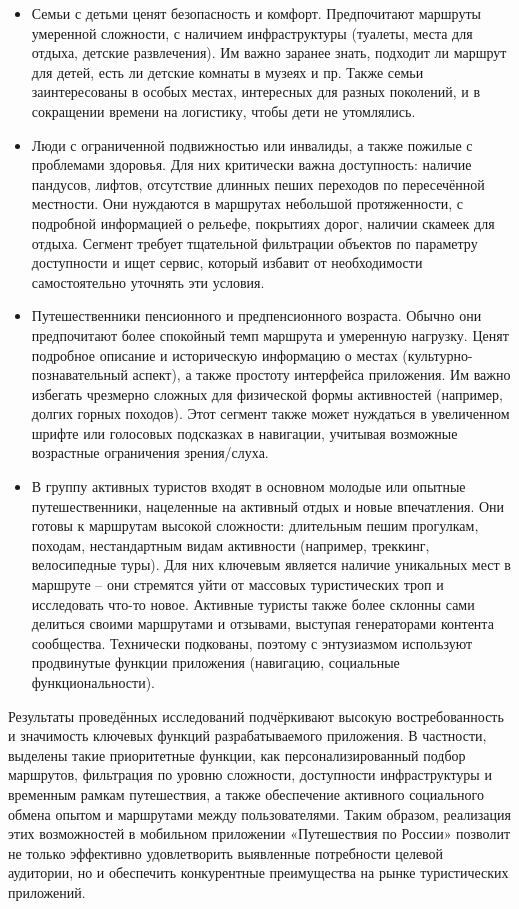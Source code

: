 \begin{itemize}
    \item 	Семьи с детьми ценят безопасность и комфорт. Предпочитают маршруты умеренной сложности, с наличием инфраструктуры (туалеты, места для отдыха, детские развлечения). Им важно заранее знать, подходит ли маршрут для детей, есть ли детские комнаты в музеях и пр. Также семьи заинтересованы в особых местах, интересных для разных поколений, и в сокращении времени на логистику, чтобы дети не утомлялись.
    \item 	Люди с ограниченной подвижностью или инвалиды, а также пожилые с проблемами здоровья. Для них критически важна доступность: наличие пандусов, лифтов, отсутствие длинных пеших переходов по пересечённой местности. Они нуждаются в маршрутах небольшой протяженности, с подробной информацией о рельефе, покрытиях дорог, наличии скамеек для отдыха. Сегмент требует тщательной фильтрации объектов по параметру доступности и ищет сервис, который избавит от необходимости самостоятельно уточнять эти условия.
    \item 	Путешественники пенсионного и предпенсионного возраста. Обычно они предпочитают более спокойный темп маршрута и умеренную нагрузку. Ценят подробное описание и историческую информацию о местах (культурно-познавательный аспект), а также простоту интерфейса приложения. Им важно избегать чрезмерно сложных для физической формы активностей (например, долгих горных походов). Этот сегмент также может нуждаться в увеличенном шрифте или голосовых подсказках в навигации, учитывая возможные возрастные ограничения зрения/слуха.
    \item 	В группу активных туристов входят в основном молодые или опытные путешественники, нацеленные на активный отдых и новые впечатления. Они готовы к маршрутам высокой сложности: длительным пешим прогулкам, походам, нестандартным видам активности (например, треккинг, велосипедные туры). Для них ключевым является наличие уникальных мест в маршруте – они стремятся уйти от массовых туристических троп и исследовать что-то новое. Активные туристы также более склонны сами делиться своими маршрутами и отзывами, выступая генераторами контента сообщества. Технически подкованы, поэтому с энтузиазмом используют продвинутые функции приложения (навигацию, социальные функциональности).
\end{itemize}

Результаты проведённых исследований подчёркивают высокую востребованность и значимость ключевых функций разрабатываемого приложения. В частности, выделены такие приоритетные функции, как персонализированный подбор маршрутов, фильтрация по уровню сложности, доступности инфраструктуры и временным рамкам путешествия, а также обеспечение активного социального обмена опытом и маршрутами между пользователями. Таким образом, реализация этих возможностей в мобильном приложении «Путешествия по России» позволит не только эффективно удовлетворить выявленные потребности целевой аудитории, но и обеспечить конкурентные преимущества на рынке туристических приложений.

